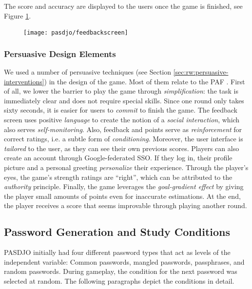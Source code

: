The score and accuracy are displayed to the users once the game is finished, see Figure \ref{fig:pasdjo:feedbackscreen}.

\begin{figure}
	\centering
	\texttt{[image: pasdjo/feedbackscreen]}
	\caption{\label{fig:pasdjo:feedbackscreen}}
\end{figure}

\subsubsection{Persuasive Design Elements}
We used a number of persuasive techniques (see Section \ref{sec:rw:persuasive-interventions}) in the design of the game. Most of them relate to the \acrlong{PAF} \cite{Forget2007PersuasionEducationSecurity}. First of all, we lower the barrier to play the game through \textit{simplification}: the task is immediately clear and does not require special skills. Since one round only takes sixty seconds, it is easier for users to \textit{commit} to finish the game. The feedback screen uses positive \textit{language} to create the notion of a \textit{social interaction}, which also serves \textit{self-monitoring}. Also, feedback and points serve as \textit{reinforcement} for correct ratings, i.e. a subtle form of \textit{conditioning}. Moreover, the user interface is \textit{tailored} to the user, as they can see their own previous scores. Players can also create an account through Google-federated \gls{SSO}. If they log in, their profile picture and a personal greeting \textit{personalize} their experience. Through the player's eyes, the game's strength ratings are ``right'', which can be attributed to the \textit{authority} principle. Finally, the game leverages the \textit{goal-gradient effect} by giving the player small amounts of points even for inaccurate estimations. At the end, the player receives a score that seems improvable through playing another round. 

\subsection{Password Generation and Study Conditions}
\makeatletter
PASDJO initially had four different password types that act as levels of the independent variable: Common passwords, mangled passwords, passphrases, and random passwords. During gameplay, the condition for the next password was selected at random. The following paragraphs depict the conditions in detail. 

